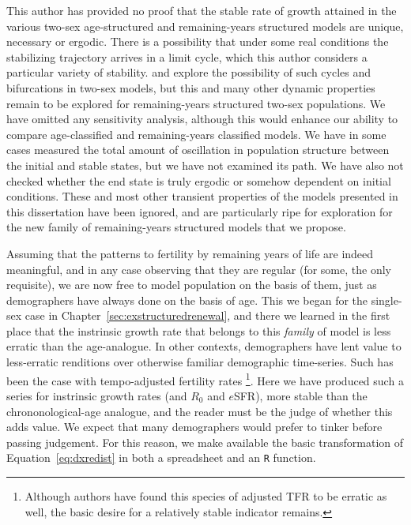This author has provided no proof that the stable rate of growth
attained in the various two-sex age-structured and remaining-years structured
models are unique, necessary or ergodic. There is a possibility that under some
real conditions the stabilizing trajectory arrives in a limit cycle, which this
author considers a particular variety of stability. \citet{wijewickrema1980weak}
and \citet{chung1990phd, chung1994cycles} explore the possibility of such cycles
and bifurcations in two-sex models, but this and many other dynamic
properties remain to be explored for remaining-years structured two-sex
populations. We have omitted any sensitivity analysis, although this would
enhance our ability to compare age-classified and remaining-years
classified models. We have in some cases measured the total amount of
oscillation in population structure between the initial and stable states, but
we have not examined its path. We have also not checked whether the end state
is truly ergodic or somehow dependent on initial conditions. These and most
other transient properties of the models presented in this dissertation have
been ignored, and are particularly ripe for exploration for the new family of
remaining-years structured models that we propose.

Assuming that the patterns to fertility by remaining years of life
are indeed meaningful, and in any case observing that they are regular (for
some, the only requisite), we are now free to model population on the basis of
them, just as demographers have always done on the basis of age. This we began
for the single-sex case in Chapter~\ref{sec:exstructuredrenewal}, and there we
learned in the first place that the instrinsic growth rate that belongs to this
\textit{family} of model is less erratic than the age-analogue. In other
contexts, demographers have lent value to less-erratic renditions over otherwise
familiar demographic time-series. Such has been the case with tempo-adjusted
fertility rates \citep{bongaarts1998quantum}\footnote{Although authors
\citep[e.g.][]{kim2000quantum} have found this species of adjusted TFR to be
erratic as well, the basic desire for a relatively stable indicator remains.}.
Here we have produced such a series for instrinsic growth rates (and $R_0$ and $e$SFR), 
more stable than the chrononological-age analogue, and the reader must be the 
judge of whether this adds value. We expect that many demographers would prefer
to tinker before passing judgement. For this reason, we make available the 
basic transformation of Equation~\eqref{eq:dxredist} in both a spreadsheet and
an \texttt{R} function.

